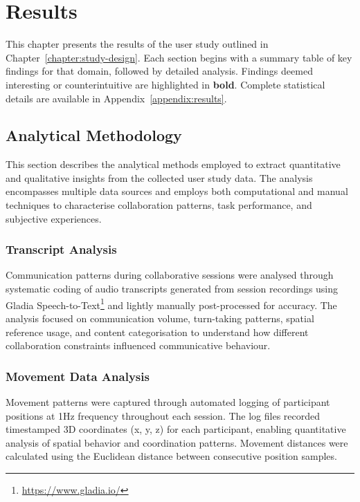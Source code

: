 \chapter{Results}\label{chapter:results}

This chapter presents the results of the user study outlined in Chapter~\ref{chapter:study-design}. Each section begins with a summary table of key findings for that domain, followed by detailed analysis. Findings deemed interesting or counterintuitive are highlighted in \textbf{bold}. Complete statistical details are available in Appendix~\ref{appendix:results}.

\section{Analytical Methodology}

This section describes the analytical methods employed to extract quantitative and qualitative insights from the collected user study data. The analysis encompasses multiple data sources and employs both computational and manual techniques to characterise collaboration patterns, task performance, and subjective experiences.

\subsection{Transcript Analysis}
Communication patterns during collaborative sessions were analysed through systematic coding of audio transcripts generated from session recordings using Gladia Speech-to-Text\footnote{\url{https://www.gladia.io/}} and lightly manually post-processed for accuracy. The analysis focused on communication volume, turn-taking patterns, spatial reference usage, and content categorisation to understand how different collaboration constraints influenced communicative behaviour.

\subsection{Movement Data Analysis}

Movement patterns were captured through automated logging of participant positions at 1Hz frequency throughout each session. The log files recorded timestamped 3D coordinates (x, y, z) for each participant, enabling quantitative analysis of spatial behavior and coordination patterns.
Movement distances were calculated using the Euclidean distance between consecutive position samples.

